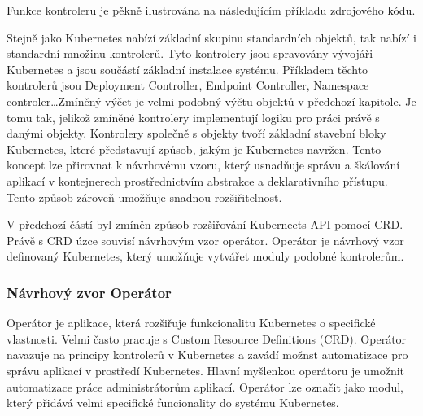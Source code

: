 Funkce kontroleru je pěkně ilustrována na následujícím příkladu zdrojového kódu. \cite{nguyen_2017_a}


Stejně jako Kubernetes nabízí základní skupinu standardních objektů, tak nabízí i standardní množinu kontrolerů. Tyto kontrolery jsou spravovány vývojáři Kubernetes a jsou součástí základní instalace systému. Příkladem těchto kontrolerů jsou Deployment Controller, Endpoint Controller, Namespace controler\ldots Zmíněný výčet je velmi podobný výčtu objektů v předchozí kapitole. Je tomu tak, jelikož zmíněné kontrolery implementují logiku pro práci právě s danými objekty. Kontrolery společně s objekty tvoří základní stavební bloky Kubernetes, které představují způsob, jakým je Kubernetes navržen. Tento koncept lze přirovnat k návrhovému vzoru, který usnadňuje správu a škálování aplikací v kontejnerech prostřednictvím abstrakce a deklarativního přístupu. Tento způsob zároveň umožňuje snadnou rozšiřitelnost.

V předchozí částí byl zmíněn způsob rozšiřování Kuberneets API pomocí CRD. Právě s CRD úzce souvisí návrhovým vzor operátor. Operátor je návrhový vzor definovaný Kubernetes, který umožňuje vytvářet moduly podobné kontrolerům. 
\subsubsection{Návrhový zvor Operátor}
Operátor je aplikace, která rozšiřuje funkcionalitu Kubernetes o specifické vlastnosti. Velmi často pracuje s Custom Resource Definitions (CRD). Operátor navazuje na principy kontrolerů v Kubernetes a zavádí možnst automatizace pro správu aplikací v prostředí Kubernetes. Hlavní myšlenkou operátoru je umožnit automatizace práce administrátorům aplikací. Operátor lze označit jako modul, který přidává velmi specifické funcionality do systému Kubernetes. 

